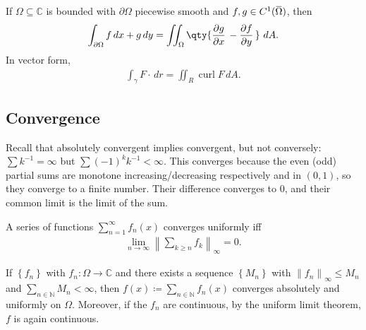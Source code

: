 \begin{theorem}

If \(\Omega \subseteq {\mathbb{C}}\) is bounded with
\({{\partial}}\Omega\) piecewise smooth and
\(f, g\in C^1(\mkern 1.5mu\overline{\mkern-1.5mu\Omega\mkern-1.5mu}\mkern 1.5mu)\),
then
\begin{align*}\int_{{{\partial}}\Omega} f\, dx + g\, dy = \iint_{\Omega} \qty{ {\frac{\partial g}{\partial x}\,} - {\frac{\partial f}{\partial y}\,} } \, \,dA.\end{align*}
In vector form,
\begin{align*}
\int_\gamma F\cdot \,dr= \iint_R \operatorname{curl}F \,dA
.\end{align*}

\end{theorem}

\hypertarget{convergence}{%
\subsection{Convergence}\label{convergence}}

\begin{remark}

Recall that absolutely convergent implies convergent, but not
conversely: \(\sum k^{-1}= \infty\) but \(\sum (-1)^k k^{-1}< \infty\).
This converges because the even (odd) partial sums are monotone
increasing/decreasing respectively and in \((0, 1)\), so they converge
to a finite number. Their difference converges to 0, and their common
limit is the limit of the sum.

\end{remark}

\begin{proposition}

A series of functions \(\sum_{n=1}^\infty f_n(x)\) converges uniformly
iff
\begin{align*}  
\lim_{n\to \infty} {\left\lVert { \sum_{k\geq n} f_k } \right\rVert}_\infty = 0
.\end{align*}

\end{proposition}

\begin{theorem}

If \(\left\{{f_n}\right\}\) with \(f_n: \Omega \to {\mathbb{C}}\) and
there exists a sequence \(\left\{{M_n}\right\}\) with
\({\left\lVert {f_n} \right\rVert}_\infty \leq M_n\) and
\(\sum_{n\in {\mathbb{N}}} M_n < \infty\), then
\(f(x) \coloneqq\sum_{n\in {\mathbb{N}}} f_n(x)\) converges absolutely
and uniformly on \(\Omega\). Moreover, if the \(f_n\) are continuous, by
the uniform limit theorem, \(f\) is again continuous.

\end{theorem}

